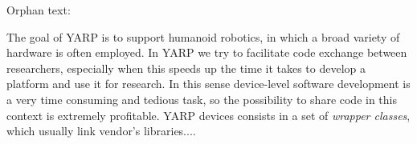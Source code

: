 Orphan text:

The goal of YARP is to support humanoid robotics, in which a broad 
variety of hardware is often employed. In YARP we try to facilitate code 
exchange between researchers, especially when this speeds up the time 
it takes to develop a platform and use it for research. In this sense 
device-level software development is a very time consuming and tedious 
task, so the possibility to share code in this context is extremely 
profitable. YARP devices consists in a set of \emph{wrapper classes}, 
which usually link vendor's libraries.... 


